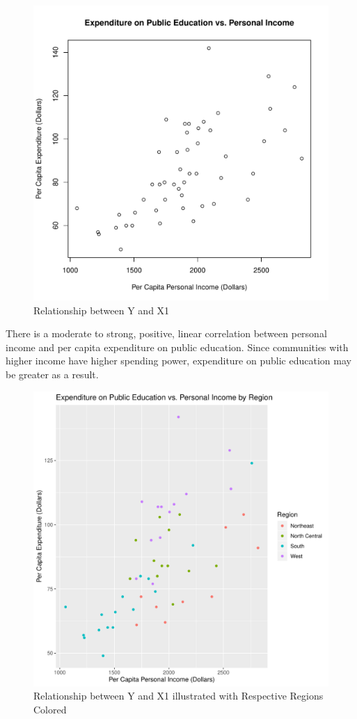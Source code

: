 \documentclass[12pt,letterpaper]{article}
\begin{document}
\begin{itemize}
\begin{figure} [h]
	\centering
	\includegraphics[width=0.7\linewidth]{Graph4}
	\caption{Relationship between Y and X1 }
	\label{fig:graph2}
\end{figure}



\noindent There is a moderate to strong, positive, linear correlation between personal income and per capita expenditure on public education. Since communities with higher income have higher spending power, expenditure on public education may be greater as a result.

\begin{figure} [h]
	\centering
	\includegraphics[width=0.9\linewidth]{Graph5}
	\caption{Relationship between Y and X1 illustrated with Respective Regions Colored}
	\label{fig:graph2}
\end{figure}


\end{itemize}
\end{document}
